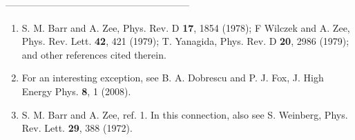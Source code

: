 \documentclass[12pt]{article}
\begin{document}
\begin{center}                               
---------------------------------------------------------
\end{center}                                                                                                                                                           \begin{enumerate}
\item S. M. Barr and A. Zee, Phys. Rev. D {\bf 17}, 1854 (1978); F Wilczek and A. Zee, Phys. Rev. Lett. {\bf 42}, 421 (1979); T. Yanagida, Phys. Rev. D {\bf 20}, 2986 (1979); and other references cited therein.
\item For an interesting exception, see B. A. Dobrescu and P. J. Fox, J. High Energy Phys. {\bf 8}, 1 (2008).
\item  S. M. Barr and A. Zee, ref. 1.  In this connection, also see S. Weinberg,   Phys. Rev. Lett. {\bf 29}, 388 (1972).

\end{enumerate}
\end{document}
